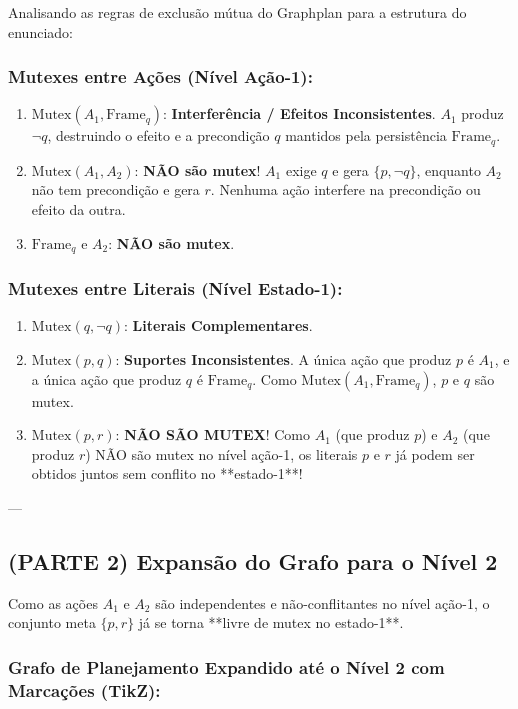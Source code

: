 \documentclass[a4paper,12pt]{article}
\begin{document}
Analisando as regras de exclusão mútua do Graphplan para a estrutura do enunciado:

\subsubsection*{Mutexes entre Ações (Nível Ação-1):}
\begin{enumerate}
	\item $\text{Mutex}(A_1, \text{Frame}_q)$: \textbf{Interferência / Efeitos Inconsistentes}. $A_1$ produz $\neg q$, destruindo o efeito e a precondição $q$ mantidos pela persistência $\text{Frame}_q$.
	\item $\text{Mutex}(A_1, A_2)$: \textbf{NÃO são mutex}! $A_1$ exige $q$ e gera $\{p, \neg q\}$, enquanto $A_2$ não tem precondição e gera $r$. Nenhuma ação interfere na precondição ou efeito da outra.
	\item $\text{Frame}_q$ e $A_2$: \textbf{NÃO são mutex}.
\end{enumerate}

\subsubsection*{Mutexes entre Literais (Nível Estado-1):}
\begin{enumerate}
	\item $\text{Mutex}(q, \neg q)$: \textbf{Literais Complementares}.
	\item $\text{Mutex}(p, q)$: \textbf{Suportes Inconsistentes}. A única ação que produz $p$ é $A_1$, e a única ação que produz $q$ é $\text{Frame}_q$. Como $\text{Mutex}(A_1, \text{Frame}_q)$, $p$ e $q$ são mutex.
	\item $\text{Mutex}(p, r)$: \textbf{NÃO SÃO MUTEX}! Como $A_1$ (que produz $p$) e $A_2$ (que produz $r$) NÃO são mutex no nível ação-1, os literais $p$ e $r$ já podem ser obtidos juntos sem conflito no **estado-1**!
\end{enumerate}

---

\subsection*{(PARTE 2) Expansão do Grafo para o Nível 2}

Como as ações $A_1$ e $A_2$ são independentes e não-conflitantes no nível ação-1, o conjunto meta $\{p, r\}$ já se torna **livre de mutex no estado-1**. 

\subsubsection*{Grafo de Planejamento Expandido até o Nível 2 com Marcações (TikZ):}
\end{document}
